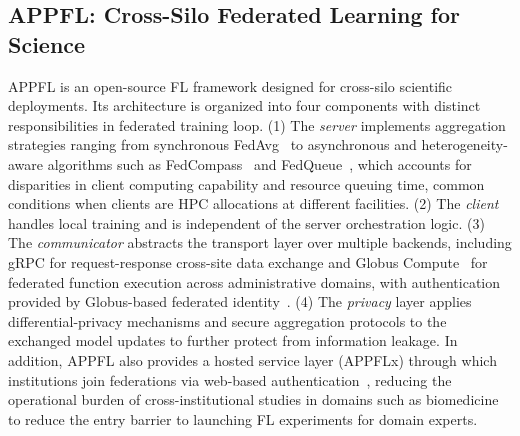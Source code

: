 \documentclass[conference]{IEEEtran}
\begin{document}
\subsection{APPFL: Cross-Silo Federated Learning for Science}
APPFL is an open-source FL framework designed for cross-silo scientific deployments. Its architecture is organized into four components with distinct responsibilities in federated training loop. (1) The \emph{server} implements aggregation strategies ranging from synchronous FedAvg~\cite{mcmahan2017communication} to asynchronous and heterogeneity-aware algorithms such as FedCompass~\cite{li2024fedcompass} and FedQueue~\cite{li2026fedqueue}, which accounts for disparities in client computing capability and resource queuing time, common conditions when clients are HPC allocations at different facilities. (2) The \emph{client} handles local training and is independent of the server orchestration logic. (3) The \emph{communicator} abstracts the transport layer over multiple backends, including gRPC for request-response cross-site data exchange and Globus Compute~\cite{chard2020funcx} for federated function execution across administrative domains, with authentication provided by Globus-based federated identity~\cite{tuecke2016globus}. (4) The \emph{privacy} layer applies differential-privacy mechanisms and secure aggregation protocols to the exchanged model updates to further protect from information leakage. In addition, APPFL also provides a hosted service layer (APPFLx) through which institutions join federations via web-based authentication~\cite{hoang2025enabling}, reducing the operational burden of cross-institutional studies in domains such as biomedicine to reduce the entry barrier to launching FL experiments for domain experts.
\end{document}

